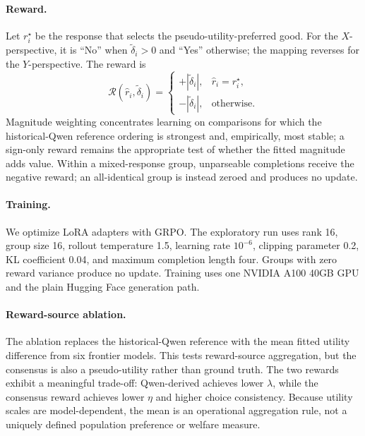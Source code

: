 \documentclass[letterpaper]{article} %
\begin{document}
\paragraph{Reward.}
Let $r_i^\star$ be the response that selects the pseudo-utility-preferred good.
For the $X$-perspective, it is ``No'' when
$\widetilde{\delta}_i>0$ and ``Yes'' otherwise; the mapping reverses for the
$Y$-perspective. The reward is
\begin{equation}
\mathcal R(\widehat r_i,\widetilde{\delta}_i)=
\begin{cases}
+|\widetilde{\delta}_i|,&\widehat r_i=r_i^\star,\\
-|\widetilde{\delta}_i|,&\text{otherwise}.
\end{cases}
\label{eq:reward}
\end{equation}
Magnitude weighting concentrates learning on comparisons for which the
historical-Qwen reference ordering is strongest and, empirically, most stable; a
sign-only reward remains the appropriate test of whether the fitted magnitude
adds value.
Within a mixed-response group, unparseable completions receive the negative
reward; an all-identical group is instead zeroed and produces no update.

\paragraph{Training.}
We optimize LoRA adapters \citep{hu2021lora} with GRPO. The exploratory run uses
rank 16, group size 16, rollout temperature 1.5, learning rate $10^{-6}$,
clipping parameter 0.2, KL coefficient 0.04, and maximum completion length
four. Groups with zero reward variance produce no update. Training uses one
NVIDIA A100 40GB GPU and the plain Hugging Face generation path.

\paragraph{Reward-source ablation.}
The ablation replaces the historical-Qwen reference with the mean fitted utility
difference from six frontier models. This tests reward-source aggregation, but the
consensus is also a pseudo-utility rather than ground truth. The two rewards
exhibit a meaningful trade-off: Qwen-derived achieves lower $\lambda$, while the
consensus reward achieves lower $\eta$ and higher choice consistency. Because
utility scales are model-dependent, the mean is an operational aggregation
rule, not a uniquely defined population preference or welfare measure.
\end{document}
